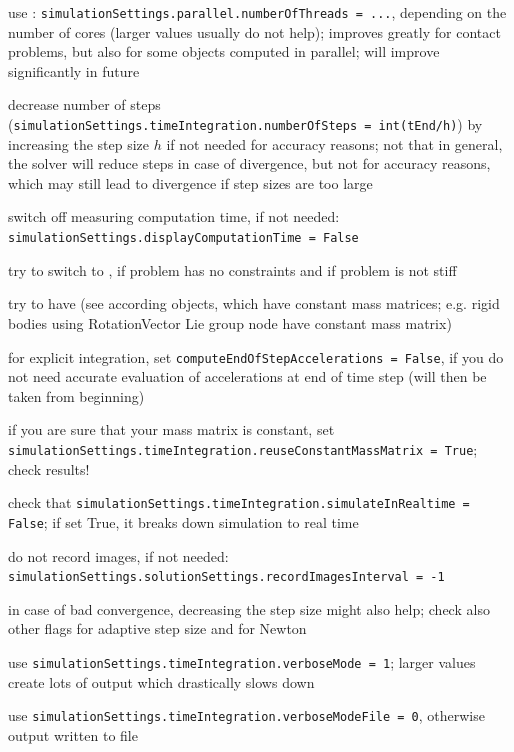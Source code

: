   \item use : \texttt{simulationSettings.parallel.numberOfThreads = ...}, depending on the number of cores (larger values usually do not help); improves greatly for contact problems, but also for some objects computed in parallel; will improve significantly in future
  \item decrease number of steps (\texttt{simulationSettings.timeIntegration.numberOfSteps = int(tEnd/h)}) by increasing the step size $h$ if not needed for accuracy reasons; not that in general, the solver will reduce steps in case of divergence, but not for accuracy reasons, which may still lead to divergence if step sizes are too large
  \item switch off measuring computation time, if not needed: \texttt{simulationSettings.displayComputationTime = False}
  \item try to switch to , if problem has no constraints and if problem is not stiff
  \item try to have  (see according objects, which have constant mass matrices; e.g. rigid bodies using RotationVector Lie group node have constant mass matrix)
  \item for explicit integration, set \texttt{computeEndOfStepAccelerations = False}, if you do not need accurate evaluation of accelerations at end of time step (will then be taken from beginning)
  \item if you are sure that your mass matrix is constant, set \texttt{simulationSettings.timeIntegration.reuseConstantMassMatrix = True}; check results!
  \item check that \texttt{simulationSettings.timeIntegration.simulateInRealtime = False}; if set True, it breaks down simulation to real time
  \item do not record images, if not needed: \texttt{simulationSettings.solutionSettings.recordImagesInterval = -1}
  \item in case of bad convergence, decreasing the step size might also help; check also other flags for adaptive step size and for Newton
  \item use \texttt{simulationSettings.timeIntegration.verboseMode = 1}; larger values create lots of output which drastically slows down
  \item use \texttt{simulationSettings.timeIntegration.verboseModeFile = 0}, otherwise output written to file
